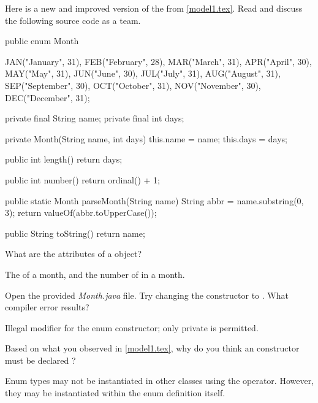 
Here is a new and improved version of the  from \ref{model1.tex}.
Read and discuss the following source code as a team.

\medskip

\begin{javabox}
public enum Month {

    JAN("January", 31),
    FEB("February", 28),
    MAR("March", 31),
    APR("April", 30),
    MAY("May", 31),
    JUN("June", 30),
    JUL("July", 31),
    AUG("August", 31),
    SEP("September", 30),
    OCT("October", 31),
    NOV("November", 30),
    DEC("December", 31);

    private final String name;
    private final int days;

    private Month(String name, int days) {
        this.name = name;
        this.days = days;
    }

    public int length() {
        return days;
    }

    public int number() {
        return ordinal() + 1;
    }

    public static Month parseMonth(String name) {
        String abbr = name.substring(0, 3);
        return valueOf(abbr.toUpperCase());
    }

    public String toString() {
        return name;
    }

}
\end{javabox}




\Q What are the attributes of a  object?

\begin{answer}[3em]
The  of a month, and the number of  in a month.
\end{answer}


\Q Open the provided \textit{Month.java} file.
Try changing the constructor to .
What compiler error results?

\begin{answer}[3em]
Illegal modifier for the enum constructor; only private is permitted.
\end{answer}


\Q \label{key3}
Based on what you observed in \ref{model1.tex}, why do you think an  constructor must be declared ?

\begin{answer}
Enum types may not be instantiated in other classes using the  operator.
However, they may be instantiated within the enum definition itself.
\end{answer}


